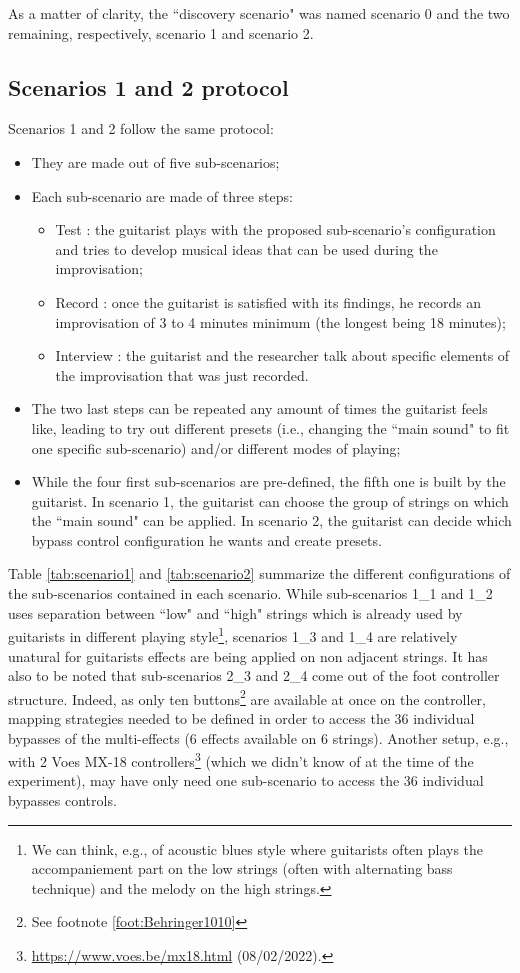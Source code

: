 \documentclass{article}
\begin{document}
As a matter of clarity, the ``discovery scenario" was named scenario 0 and the two remaining, respectively, scenario 1 and scenario 2.

\subsection{Scenarios 1 and 2 protocol}
Scenarios 1 and 2 follow the same protocol: 
\begin{itemize}
    \item They are made out of five sub-scenarios;
    \item Each sub-scenario are made of three steps: 
    \begin{itemize}
        \item Test : the guitarist plays with the proposed sub-scenario's configuration and tries to develop musical ideas that can be used during the improvisation;
        \item Record : once the guitarist is satisfied with its findings, he records an improvisation of 3 to 4 minutes minimum (the longest being 18 minutes);
        \item Interview : the guitarist and the researcher talk about specific elements of the improvisation that was just recorded.
    \end{itemize}
    \item The two last steps can be repeated any amount of times the guitarist feels like, leading to try out different presets (i.e., changing the ``main sound" to fit one specific sub-scenario) and/or different modes of playing;
    \item While the four first sub-scenarios are pre-defined, the fifth one is built by the guitarist. In scenario 1, the guitarist can choose the group of strings on which the ``main sound" can be applied. In scenario 2, the guitarist can decide which bypass control configuration he wants and create presets.
\end{itemize}

Table \ref{tab:scenario1} and \ref{tab:scenario2} summarize the different configurations of the sub-scenarios contained in each scenario.
While sub-scenarios 1\_1 and 1\_2 uses separation between ``low" and ``high" strings which is already used by guitarists in different playing style\footnote{We can think, e.g., of acoustic blues style where guitarists often plays the accompaniement part on the low strings (often with alternating bass technique) and the melody on the high strings.}, scenarios 1\_3 and 1\_4 are relatively unatural for guitarists effects are being applied on non adjacent strings.
It has also to be noted that sub-scenarios 2\_3 and 2\_4 come out of the foot controller structure. Indeed, as only ten buttons\footnote{See footnote \ref{foot:Behringer1010}} are available at once on the controller, mapping strategies needed to be defined in order to access the 36 individual bypasses of the multi-effects (6 effects available on 6 strings). Another setup, e.g., with 2 Voes MX-18 controllers\footnote{\url{https://www.voes.be/mx18.html} (08/02/2022).} (which we didn't know of at the time of the experiment), may have only need one sub-scenario to access the 36 individual bypasses controls.
\end{document}

